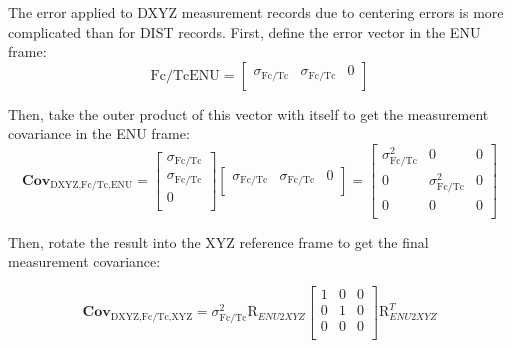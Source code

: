 The error applied to DXYZ measurement records due to centering errors is more complicated than for DIST records. First, define the error vector in the ENU frame:
\begin{equation}\label{eq:fctcENU} %
    \text{Fc/TcENU} = \left[ \begin{array}{ccc} \sigma_{\text{Fc/Tc}} & \sigma_{\text{Fc/Tc}} & 0 \\ \end{array} \right]
\end{equation}

Then, take the outer product of this vector with itself to get the measurement covariance in the ENU frame:
\begin{equation}\label{eq:fctcXYZ} %
    \textbf{Cov}_{\text{DXYZ,Fc/Tc,ENU}} =\left[ \begin{array}{c} \sigma_{\text{Fc/Tc}} \\ \sigma_{\text{Fc/Tc}} \\ 0 \\ \end{array} \right] \left[ \begin{array}{ccc} \sigma_{\text{Fc/Tc}} & \sigma_{\text{Fc/Tc}} & 0 \\ \end{array} \right] = \left[ \begin{array}{ccc} \sigma_{\text{Fc/Tc}}^2 & 0 & 0\\ 0 & \sigma_{\text{Fc/Tc}}^2 & 0\\ 0 & 0 & 0 \\ \end{array} \right]
\end{equation}

Then, rotate the result into the XYZ reference frame to get the final measurement covariance:

\begin{equation}\label{eq:dxyzCenterErr} %
    \textbf{Cov}_{\text{DXYZ,Fc/Tc,XYZ}} = \sigma_{\text{Fc/Tc}}^2 \text{R}_{ENU2XYZ} \left[ \begin{array}{ccc} 
                                                                                1 & 0 & 0 \\
                                                                                0 & 1 & 0 \\
                                                                                0 & 0 & 0 \\
                                                                            \end{array} \right] \text{R}_{ENU2XYZ}^{T}
\end{equation}


